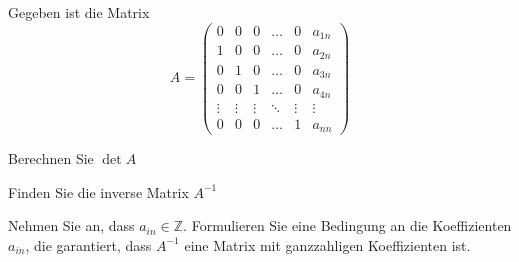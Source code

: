 Gegeben ist die Matrix
\[
A
=
\begin{pmatrix}
0&0&0&\dots&0&a_{1n}\\
1&0&0&\dots&0&a_{2n}\\
0&1&0&\dots&0&a_{3n}\\
0&0&1&\dots&0&a_{4n}\\
\vdots&\vdots&\vdots&\ddots&\vdots&\vdots\\
0&0&0&\dots&1&a_{nn}
\end{pmatrix}
\]
\begin{teilaufgaben}
\item Berechnen Sie $\det A$
\item Finden Sie die inverse Matrix $A^{-1}$
\item Nehmen Sie an, dass $a_{in}\in\mathbb{Z}$.
Formulieren Sie eine Bedingung an die Koeffizienten $a_{in}$, die garantiert,
dass $A^{-1}$ eine Matrix mit ganzzahligen Koeffizienten ist.
\end{teilaufgaben}

